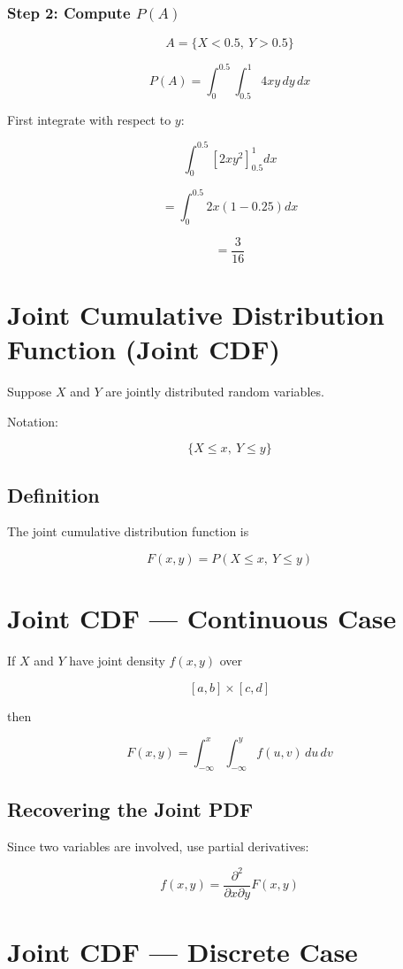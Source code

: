 \documentclass[11pt]{article}
\begin{document}
\subsubsection*{Step 2: Compute $P(A)$}

\[
A = \{X < 0.5,\ Y > 0.5\}
\]

\[
P(A) = \int_0^{0.5} \int_{0.5}^{1} 4xy\,dy\,dx
\]

First integrate with respect to $y$:

\[
\int_0^{0.5} \left[2xy^2\right]_{0.5}^{1} dx
\]

\[
= \int_0^{0.5} 2x(1 - 0.25) dx
\]

\[
= \frac{3}{16}
\]

\section{Joint Cumulative Distribution Function (Joint CDF)}

Suppose $X$ and $Y$ are jointly distributed random variables.

Notation:

\[
\{X \le x,\ Y \le y\}
\]

\subsection*{Definition}

The joint cumulative distribution function is

\[
F(x,y) = P(X \le x,\ Y \le y)
\]

\section{Joint CDF — Continuous Case}

If $X$ and $Y$ have joint density $f(x,y)$ over

\[
[a,b] \times [c,d]
\]

then

\[
F(x,y) = \int_{-\infty}^{x} \int_{-\infty}^{y} f(u,v)\,du\,dv
\]

\subsection*{Recovering the Joint PDF}

Since two variables are involved, use partial derivatives:

\[
f(x,y) = \frac{\partial^2}{\partial x \partial y} F(x,y)
\]

\section{Joint CDF — Discrete Case}
\end{document}
